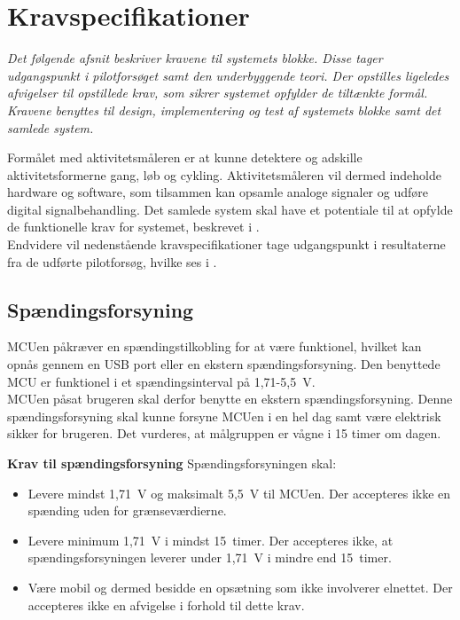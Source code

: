 \section{Kravspecifikationer}\label{Sec:krav}
\textit{Det følgende afsnit beskriver kravene til systemets blokke. Disse tager udgangspunkt i pilotforsøget samt den underbyggende teori. Der opstilles ligeledes afvigelser til opstillede krav, som sikrer systemet opfylder de tiltænkte formål. Kravene benyttes til design, implementering og test af systemets blokke samt det samlede system.}

Formålet med aktivitetsmåleren er at kunne detektere og adskille aktivitetsformerne gang, løb og cykling. Aktivitetsmåleren vil dermed indeholde hardware og software, som tilsammen kan opsamle analoge signaler og udføre digital signalbehandling. Det samlede system skal have et potentiale til at opfylde de funktionelle krav for systemet, beskrevet i . \\
Endvidere vil nedenstående kravspecifikationer tage udgangspunkt i resultaterne fra de udførte pilotforsøg, hvilke ses i .

\subsection{Spændingsforsyning} \label{krav_spaendingsf}
MCUen påkræver en spændingstilkobling for at være funktionel, hvilket kan opnås gennem en USB port eller en ekstern spændingsforsyning. Den benyttede MCU er funktionel i et spændingsinterval på 1,71-5,5~V.\\
MCUen påsat brugeren skal derfor benytte en ekstern spændingsforsyning. Denne spændingsforsyning skal kunne forsyne MCUen i en hel dag samt være elektrisk sikker for brugeren. Det vurderes, at målgruppen er vågne i 15 timer om dagen. %

\textbf{Krav til spændingsforsyning} \newline 
Spændingsforsyningen skal:
\begin{itemize}
	\item Levere mindst 1,71~V og maksimalt 5,5~V til MCUen. Der accepteres ikke en spænding uden for grænseværdierne.
	\item Levere minimum 1,71~V i mindst 15~timer. Der accepteres ikke, at spændingsforsyningen leverer under 1,71~V i mindre end 15~timer.
	\item Være mobil og dermed besidde en opsætning som ikke involverer elnettet. Der accepteres ikke en afvigelse i forhold til dette krav.
\end{itemize}

